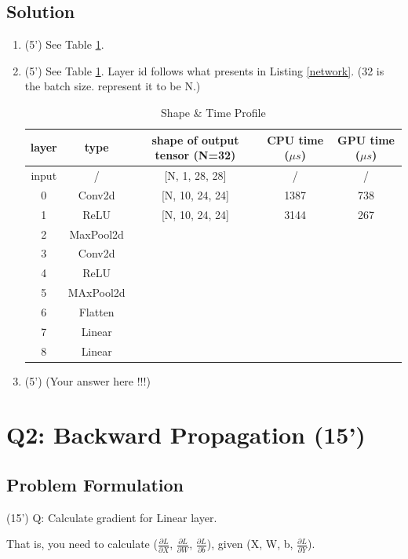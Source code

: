 \documentclass[12pt,a4paper]{article}
\theoremstyle{definition}
\begin{document}
\subsection{Solution}
\begin{enumerate}
    \item (5') See Table \ref{shape+time profile}.
    \item (5') See Table \ref{shape+time profile}.
    Layer id follows what presents in Listing \ref{network}. (32 is the batch size. represent it to be N.)
    \begin{table}[H]
        \centering
        \begin{tabular}{cc|c|cc}
        \toprule[1.5pt]
            layer & type & shape of output tensor (N=32) & CPU time ($\mu s$) & GPU time ($\mu s$) \\
            \hline
            input & / & [N, 1, 28, 28] & / & / \\
            0 & Conv2d & [N, 10, 24, 24] & 1387 & 738\\
            1 & ReLU & [N, 10, 24, 24] & 3144 & 267 \\
            2 & MaxPool2d & & & \\
            3 & Conv2d & & & \\
            4 & ReLU & & & \\
            5 & MAxPool2d & & & \\
            6 & Flatten & & & \\
            7 & Linear & & & \\
            8 & Linear & & & \\
        \bottomrule[1.5pt]
        \end{tabular}
        \caption{Shape \& Time Profile}
        \label{shape+time profile}
    \end{table}
    \item (5') 
    (Your answer here !!!)
\end{enumerate}


\section{Q2: Backward Propagation (15')}
\subsection{Problem Formulation}
     (15') Q: Calculate gradient for Linear layer. 
    
    That is, you need to calculate ($\frac{\partial L}{\partial X}$, $\frac{\partial L}{\partial W}$, $\frac{\partial L}{\partial b}$), given (X, W, b, $\frac{\partial L}{\partial Y}$).
\end{document}
